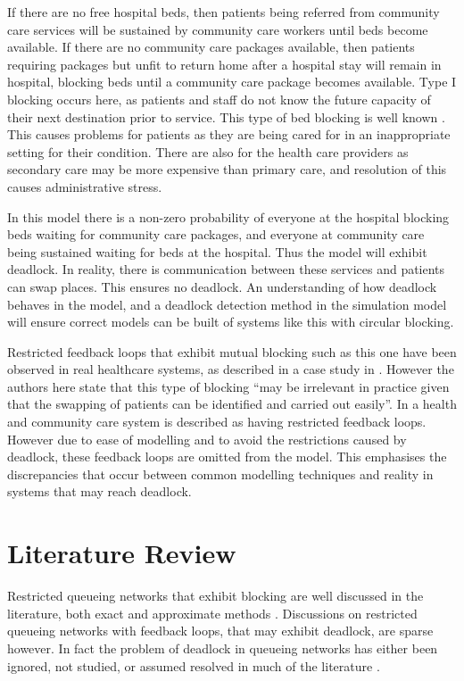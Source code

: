 \documentclass{article}
\numberwithin{equation}{section}
\begin{document}
If there are no free hospital beds, then patients being referred from
community care services will be sustained by community care workers until beds
become available.
If there are no community care packages available, then patients requiring
packages but unfit to return home after a hospital stay will remain in
hospital, blocking beds until a community care package becomes available.
Type I blocking occurs here, as patients and staff do not know the future
capacity of their next destination prior to service.
This type of bed blocking is well known \cite{manzano10}.
This causes problems for patients as they are being cared for in an
inappropriate setting for their condition.
There are also for the health care providers as secondary care may be
more expensive than primary care, and resolution of this causes
administrative stress.

In this model there is a non-zero probability of everyone at the hospital
blocking beds waiting for community care packages, and everyone at community
care being sustained waiting for beds at the hospital.
Thus the model will exhibit deadlock.
In reality, there is communication between these services and patients can
swap places.
This ensures no deadlock.
An understanding of how deadlock behaves in the model, and a deadlock
detection method in the simulation model will ensure correct models can be
built of systems like this with circular blocking.

Restricted feedback loops that exhibit mutual blocking such as this one have
been observed in real healthcare systems, as described in a case study in
\cite{osoriobierlaire09}.
However the authors here state that this type of blocking ``may be irrelevant
in practice given that the swapping of patients can be identified and carried
out easily''.
In \cite{koizumietal05} a health and community care system is described as
having restricted feedback loops.
However due to ease of modelling and to avoid the restrictions caused by
deadlock, these feedback loops are omitted from the model.
This emphasises the discrepancies that occur between common modelling
techniques and reality in systems that may reach deadlock.


\section{Literature Review}\label{sec:litreview}

Restricted queueing networks that exhibit blocking are well discussed in the
literature, both exact \cite{hunt56, baber08, aviitzhakyadin65, koizumietal05,
latoucheneuts80, perrosetal88, gordonnewell67} and approximate methods
\cite{takahashi80, korporaaletal00, onvural90, perrosetal88, dalleryfrein93,
allonetal13, osoriobierlaire09}.
Discussions on restricted queueing networks with feedback loops, that may
exhibit deadlock, are sparse however.
In fact the problem of deadlock in queueing networks has either been ignored,
not studied, or assumed resolved in much of the literature \cite{onvural90,
perrosetal88, osoriobierlaire09}.
\end{document}
